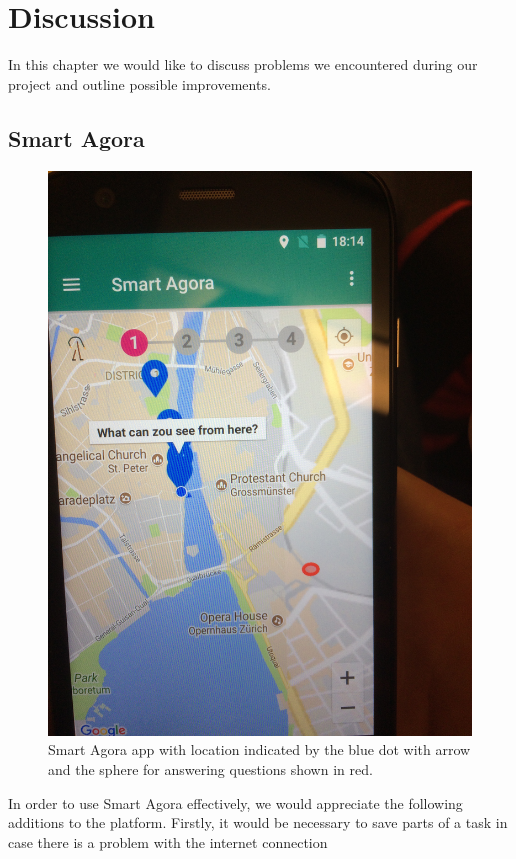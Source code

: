 \documentclass[letterpaper]{article}
\begin{document}
\section{Discussion}\label{sec:discussion}
In this chapter we would like to discuss problems we encountered during our project and outline possible improvements.
\subsection{Smart Agora}
\begin{figure}[htb]
    \centering
    \includegraphics[width=\columnwidth, rotate=270]{images/SmartAgora/img_6.jpg}
    \caption{Smart Agora app with location indicated by the blue dot with arrow and the sphere for answering questions shown in red.}
    \label{fig:smart_agora_1}
\end{figure}
In order to use Smart Agora effectively, we would appreciate the following additions to the platform. Firstly, 
it would be necessary to save parts of a task in case there is a problem with the internet connection 
\end{document}
